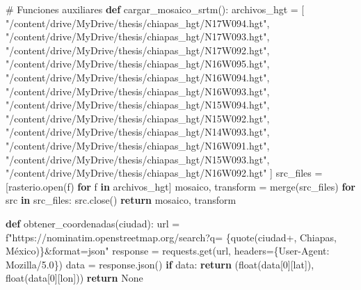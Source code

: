 \documentclass[
  letterpaper,
  DIV=11,
  numbers=noendperiod]{scrreprt}
\newenvironment{Shaded}{\begin{snugshade}}{\end{snugshade}}
\newcommand{\BuiltInTok}[1]{\textcolor[rgb]{0.00,0.23,0.31}{#1}}
\newcommand{\CommentTok}[1]{\textcolor[rgb]{0.37,0.37,0.37}{#1}}
\newcommand{\ControlFlowTok}[1]{\textcolor[rgb]{0.00,0.23,0.31}{\textbf{#1}}}
\newcommand{\DecValTok}[1]{\textcolor[rgb]{0.68,0.00,0.00}{#1}}
\newcommand{\ErrorTok}[1]{\textcolor[rgb]{0.68,0.00,0.00}{#1}}
\newcommand{\KeywordTok}[1]{\textcolor[rgb]{0.00,0.23,0.31}{\textbf{#1}}}
\newcommand{\NormalTok}[1]{\textcolor[rgb]{0.00,0.23,0.31}{#1}}
\newcommand{\OperatorTok}[1]{\textcolor[rgb]{0.37,0.37,0.37}{#1}}
\newcommand{\SpecialStringTok}[1]{\textcolor[rgb]{0.13,0.47,0.30}{#1}}
\newcommand{\StringTok}[1]{\textcolor[rgb]{0.13,0.47,0.30}{#1}}
\newcommand{\VariableTok}[1]{\textcolor[rgb]{0.07,0.07,0.07}{#1}}
\begin{document}
\begin{Shaded}
\begin{Highlighting}[]
\CommentTok{\# Funciones auxiliares}
\KeywordTok{def}\NormalTok{ cargar\_mosaico\_srtm():}
\NormalTok{    archivos\_hgt }\OperatorTok{=}\NormalTok{ [}
        \StringTok{"/content/drive/MyDrive/thesis/chiapas\_hgt/N17W094.hgt"}\NormalTok{,}
        \StringTok{"/content/drive/MyDrive/thesis/chiapas\_hgt/N17W093.hgt"}\NormalTok{,}
        \StringTok{"/content/drive/MyDrive/thesis/chiapas\_hgt/N17W092.hgt"}\NormalTok{,}
        \StringTok{"/content/drive/MyDrive/thesis/chiapas\_hgt/N16W095.hgt"}\NormalTok{,}
        \StringTok{"/content/drive/MyDrive/thesis/chiapas\_hgt/N16W094.hgt"}\NormalTok{,}
        \StringTok{"/content/drive/MyDrive/thesis/chiapas\_hgt/N16W093.hgt"}\NormalTok{,}
        \StringTok{"/content/drive/MyDrive/thesis/chiapas\_hgt/N15W094.hgt"}\NormalTok{,}
        \StringTok{"/content/drive/MyDrive/thesis/chiapas\_hgt/N15W092.hgt"}\NormalTok{,}
        \StringTok{"/content/drive/MyDrive/thesis/chiapas\_hgt/N14W093.hgt"}\NormalTok{,}
        \StringTok{"/content/drive/MyDrive/thesis/chiapas\_hgt/N16W091.hgt"}\NormalTok{,}
        \StringTok{"/content/drive/MyDrive/thesis/chiapas\_hgt/N15W093.hgt"}\NormalTok{,}
        \StringTok{"/content/drive/MyDrive/thesis/chiapas\_hgt/N16W092.hgt"}
\NormalTok{    ]}
\NormalTok{    src\_files }\OperatorTok{=}\NormalTok{ [rasterio.}\BuiltInTok{open}\NormalTok{(f) }\ControlFlowTok{for}\NormalTok{ f }\KeywordTok{in}\NormalTok{ archivos\_hgt]}
\NormalTok{    mosaico, transform }\OperatorTok{=}\NormalTok{ merge(src\_files)}
    \ControlFlowTok{for}\NormalTok{ src }\KeywordTok{in}\NormalTok{ src\_files:}
\NormalTok{        src.close()}
    \ControlFlowTok{return}\NormalTok{ mosaico, transform}

\KeywordTok{def}\NormalTok{ obtener\_coordenadas(ciudad):}
\NormalTok{    url }\OperatorTok{=} \SpecialStringTok{f"https://nominatim.openstreetmap.org/search?q=}
\ErrorTok{        \{quote}\NormalTok{(ciudad}\OperatorTok{+}\StringTok{\textquotesingle{}, Chiapas, México\textquotesingle{}}\NormalTok{)\}}\OperatorTok{\&}\BuiltInTok{format}\OperatorTok{=}\NormalTok{json}\StringTok{"}
\ErrorTok{    response = requests.get}\NormalTok{(url, headers}\OperatorTok{=}\NormalTok{\{}\StringTok{\textquotesingle{}User{-}Agent\textquotesingle{}}\NormalTok{: }\StringTok{\textquotesingle{}Mozilla/5.0\textquotesingle{}}\NormalTok{\})}
\NormalTok{    data }\OperatorTok{=}\NormalTok{ response.json()}
    \ControlFlowTok{if}\NormalTok{ data:}
        \ControlFlowTok{return}\NormalTok{ (}\BuiltInTok{float}\NormalTok{(data[}\DecValTok{0}\NormalTok{][}\StringTok{\textquotesingle{}lat\textquotesingle{}}\NormalTok{]), }\BuiltInTok{float}\NormalTok{(data[}\DecValTok{0}\NormalTok{][}\StringTok{\textquotesingle{}lon\textquotesingle{}}\NormalTok{]))}
    \ControlFlowTok{return} \VariableTok{None}


\end{Highlighting}
\end{Shaded}
\end{document}
